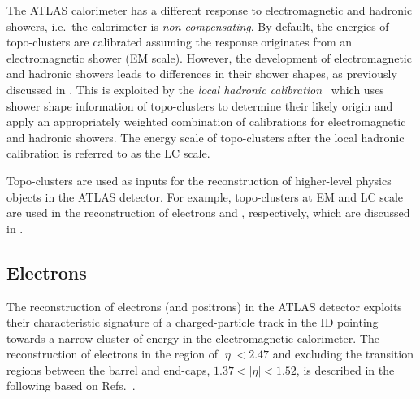 The ATLAS calorimeter has a different response to electromagnetic and hadronic
showers, i.e.\ the calorimeter is \emph{non-compensating}. By default, the
energies of topo-clusters are calibrated assuming the response originates from
an electromagnetic shower (EM scale). However, the development of
electromagnetic and hadronic showers leads to differences in their shower
shapes, as previously discussed in . This is
exploited by the \emph{local hadronic calibration}~\cite{PERF-2014-07} which
uses shower shape information of topo-clusters to determine their likely origin
and apply an appropriately weighted combination of calibrations for
electromagnetic and hadronic showers. The energy scale of topo-clusters after
the local hadronic calibration is referred to as the LC scale.

Topo-clusters are used as inputs for the reconstruction of higher-level physics
objects in the ATLAS detector. For example, topo-clusters at EM and LC scale are
used in the reconstruction of electrons and \tauhadvis, respectively, which are
discussed in .


\subsection{Electrons}%
\label{sec:ele_rec}

The reconstruction of electrons (and positrons) in the ATLAS detector exploits
their characteristic signature of a charged-particle track in the ID pointing
towards a narrow cluster of energy in the electromagnetic calorimeter. The
reconstruction of electrons in the region of $|\eta| < 2.47$ and excluding the
transition regions between the barrel and end-caps, $1.37 < |\eta| < 1.52$, is
described in the following based on
Refs.~\cite{ATL-PHYS-PUB-2017-022,EGAM-2018-01}.

